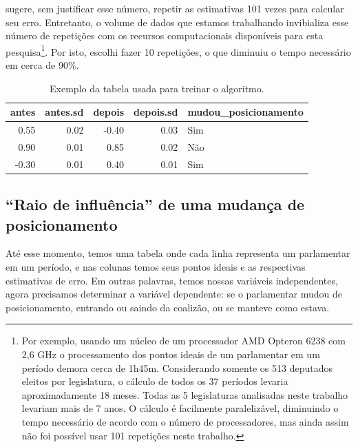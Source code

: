 \documentclass[a4paper,titlepage]{ppgi}\usepackage[]{graphicx}\usepackage[]{color}
\newenvironment{knitrout}{}{} %
\begin{document}
 sugere, sem justificar esse número, repetir as
estimativas 101 vezes para calcular seu erro. Entretanto, o volume de dados que
estamos trabalhando invibializa esse número de repetições com os recursos
computacionais disponíveis para esta pesquisa\footnote{Por exemplo, usando um
núcleo de um processador AMD Opteron\texttrademark{} 6238 com 2,6 GHz o
processamento dos pontos ideais de um parlamentar em um período demora cerca de
1h45m. Considerando somente os 513 deputados eleitos por legislatura, o
cálculo de todos os 37 períodos levaria aproximadamente 18 meses. Todas as 5
legislaturas analisadas neste trabalho levariam mais de 7 anos. O cálculo é
facilmente paralelizável, diminuindo o tempo necessário de acordo com o número
de processadores, mas ainda assim não foi possível usar 101 repetições neste
trabalho.}. Por isto, escolhi fazer 10 repetições, o que diminuiu o tempo
necessário em cerca de 90\%.

\begin{table}
\centering
\begin{knitrout}
\color{fgcolor}
\begin{tabular}{r|r|r|r|l}
\hline
antes & antes.sd & depois & depois.sd & mudou\_posicionamento\\
\hline
0.55 & 0.02 & -0.40 & 0.03 & Sim\\
\hline
0.90 & 0.01 & 0.85 & 0.02 & Não\\
\hline
-0.30 & 0.01 & 0.40 & 0.01 & Sim\\
\hline
\end{tabular}


\end{knitrout}
\caption{Exemplo da tabela usada para treinar o algoritmo.}
\label{table:dataset-final}
\end{table}

\subsection{``Raio de influência'' de uma mudança de posicionamento}
\label{cap:desenvolvimento:raio-de-influencia}

Até esse momento, temos uma tabela onde cada linha representa um parlamentar em
um período, e nas colunas temos seus pontos ideais e as respectivas estimativas
de erro. Em outras palavras, temos nossas variáveis independentes, agora
precisamos determinar a variável dependente: se o parlamentar mudou de
posicionamento, entrando ou saindo da coalizão, ou se manteve como estava.
\end{document}
